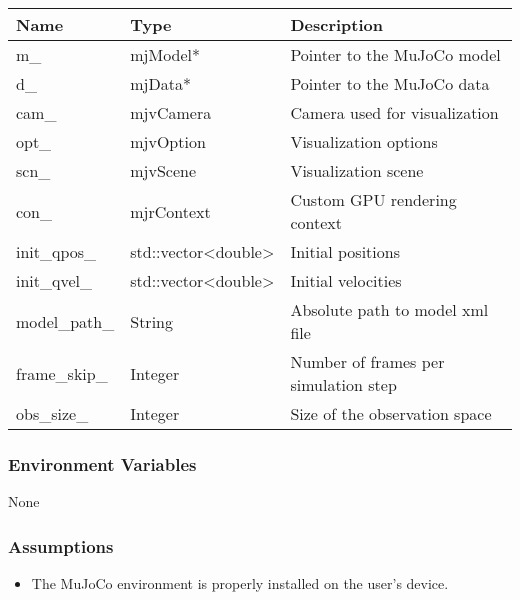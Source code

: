 \documentclass[12pt, titlepage]{article}
\begin{document}
\begin{center}
  \begin{tabular}{p{4cm} p{4cm} p{4cm}}
    \hline
    \textbf{Name} & \textbf{Type} & \textbf{Description} \\
    \hline
    m\_ & mjModel* & Pointer to the MuJoCo model\\
    \hline
    d\_ & mjData* & Pointer to the MuJoCo data\\
    \hline
    cam\_ & mjvCamera & Camera used for visualization\\
    \hline
    opt\_ & mjvOption & Visualization options\\
    \hline
    scn\_ & mjvScene & Visualization scene\\
    \hline
    con\_ & mjrContext & Custom GPU rendering context\\
    \hline
    init\_qpos\_ & std::vector<double> & Initial positions\\
    \hline
    init\_qvel\_ & std::vector<double> & Initial velocities\\
    \hline
    model\_path\_ & String & Absolute path to model xml file\\
    \hline
    frame\_skip\_ & Integer & Number of frames per simulation step\\
    \hline
    obs\_size\_ & Integer & Size of the observation space\\
    \hline
  \end{tabular}
\end{center}

\subsubsection{Environment Variables}
None

\subsubsection{Assumptions}
\begin{itemize}
  \item The MuJoCo environment is properly installed on the user's device.
\end{itemize}
\end{document}
